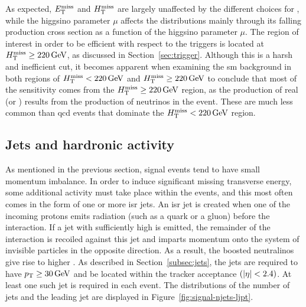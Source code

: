 As expected, $E_{\mathrm{T}}^{\text{miss}}$ and $H_{\mathrm{T}}^{\text{miss}}$ are largely unaffected by the different choices for \dm, while the higgsino parameter $\mu$ affects the distributions mainly through its falling production cross section as a function of the higgsino parameter $\mu$. The region of interest in order to be efficient with respect to the triggers is located at $H_{\mathrm{T}}^{\text{miss}}\geq 220\,\text{Ge\hspace{-.08em}V}$, as discussed in Section~\ref{sec:trigger}. Although this is a harsh and inefficient cut, it becomes apparent when examining the \gls{sm} background in both regions of $H_{\mathrm{T}}^{\text{miss}} < 220\,\text{Ge\hspace{-.08em}V}$ and $H_{\mathrm{T}}^{\text{miss}}\geq 220\,\text{Ge\hspace{-.08em}V}$ to conclude that most of the sensitivity comes from the $H_{\mathrm{T}}^{\text{miss}}\geq 220\,\text{Ge\hspace{-.08em}V}$ region, as the production of real \mht (or \MET) results from the production of neutrinos in the event. These are much less common than \gls{qcd} events that dominate the $H_{\mathrm{T}}^{\text{miss}} < 220\,\text{Ge\hspace{-.08em}V}$ region.

\subsection{Jets and hardronic activity}

As mentioned in the previous section, signal events tend to have small momentum imbalance. In order to induce significant missing transverse energy, some additional activity must take place within the events, and this most often comes in the form of one or more \gls{isr} jets. An \gls{isr} jet is created when one of the incoming protons emits radiation (such as a quark or a gluon) before the interaction. If a jet with sufficiently high \pt is emitted, the remainder of the interaction is recoiled against this jet and imparts momentum onto the system of invisible particles in the opposite direction. As a result, the boosted neutralinos \neuto give rise to higher \mht. As described in Section~\ref{subsec:jets}, the jets are required to have $p_{\mathrm{T}} \geq 30\,\text{Ge\hspace{-.08em}V}$ and be located within the tracker acceptance $\left(\abs{\eta}<2.4\right)$. At least one such jet is required in each event. The distributions of the number of jets and the leading jet \pt are displayed in Figure~\ref{fig:signal-njets-ljpt}.

